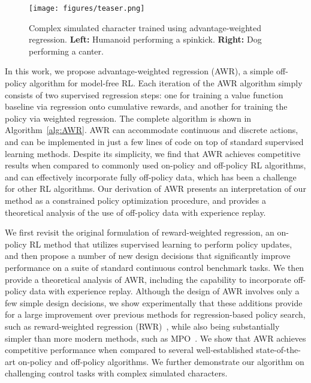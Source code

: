 \documentclass{article} \usepackage{iclr2020_conference,times}
\begin{document}
\begin{figure}[b]
    \vspace{-0.5cm}
	\centering
    \texttt{[image: figures/teaser.png]}
    \vspace{-0.5cm}
\caption{Complex simulated character trained using advantage-weighted regression. \textbf{Left:} Humanoid performing a spinkick. \textbf{Right:} Dog performing a canter.}
\label{fig:teaser}
\end{figure}

In this work, we propose advantage-weighted regression (AWR), a simple off-policy algorithm for model-free RL. Each iteration of the AWR algorithm simply consists of two supervised regression steps: one for training a value function baseline via regression onto cumulative rewards, and another for training the policy via weighted regression. The complete algorithm is shown in Algorithm~\ref{alg:AWR}. AWR can accommodate continuous and discrete actions, and can be implemented in just a few lines of code on top of standard supervised learning methods. Despite its simplicity, we find that AWR achieves competitive results when compared to commonly used on-policy and off-policy RL algorithms, and can effectively incorporate fully off-policy data, which has been a challenge for other RL algorithms. Our derivation of AWR presents an interpretation of our method as a constrained policy optimization procedure, and provides a theoretical analysis of the use of off-policy data with experience replay.

We first revisit the original formulation of reward-weighted regression, an on-policy RL method that utilizes supervised learning to perform policy updates, and then propose a number of new design decisions that significantly improve performance on a suite of standard continuous control benchmark tasks. We then provide a theoretical analysis of AWR, including the capability to incorporate off-policy data with experience replay. Although the design of AWR involves only a few simple design decisions, we show experimentally that these additions provide for a large improvement over previous methods for regression-based policy search, such as reward-weighted regression (RWR)~\citep{Peters2007RWR}, while also being substantially simpler than more modern methods, such as MPO~\citep{abdolmaleki2018maximum}. We show that AWR achieves competitive performance when compared to several well-established state-of-the-art on-policy and off-policy algorithms. We further demonstrate our algorithm on challenging control tasks with complex simulated characters.
\end{document}
